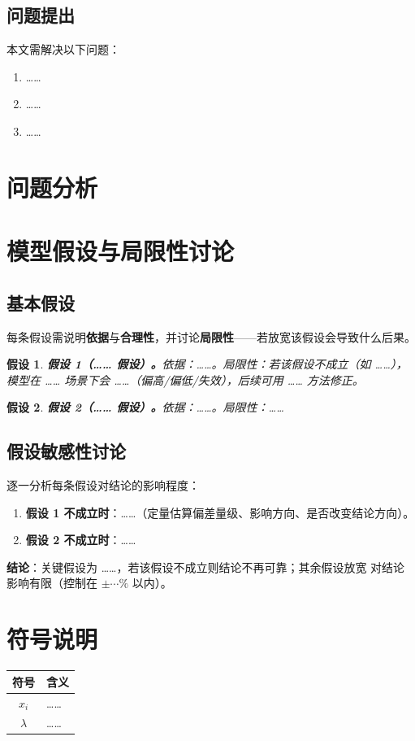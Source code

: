 \documentclass[12pt]{ctexart}
\newtheorem{assumption}{假设}
\begin{document}
\subsection{问题提出}
本文需解决以下问题：
\begin{enumerate}[label=(\arabic*)]
  \item ……
  \item ……
  \item ……
\end{enumerate}
\FloatBarrier  %

\section{问题分析}
\FloatBarrier

\section{模型假设与局限性讨论}

\subsection{基本假设}
每条假设需说明\textbf{依据}与\textbf{合理性}，并讨论\textbf{局限性}——若放宽该假设会导致什么后果。
\begin{assumption}
\textbf{假设 1（…… 假设）。}依据：……。局限性：若该假设不成立（如 ……），
模型在 …… 场景下会 ……（偏高/偏低/失效），后续可用 …… 方法修正。
\end{assumption}

\begin{assumption}
\textbf{假设 2（…… 假设）。}依据：……。局限性：……
\end{assumption}

\subsection{假设敏感性讨论}
逐一分析每条假设对结论的影响程度：
\begin{enumerate}[label=(\arabic*)]
  \item \textbf{假设 1 不成立时}：……（定量估算偏差量级、影响方向、是否改变结论方向）。
  \item \textbf{假设 2 不成立时}：……
\end{enumerate}
\textbf{结论}：关键假设为 ……，若该假设不成立则结论不再可靠；其余假设放宽
对结论影响有限（控制在 $\pm\cdots\%$ 以内）。
\FloatBarrier

\section{符号说明}
\begin{center}
\begin{tabular}{cl}
\toprule
符号 & 含义 \\
\midrule
$x_i$       & …… \\
$\lambda$   & …… \\
\bottomrule
\end{tabular}
\end{center}
\FloatBarrier
\end{document}
